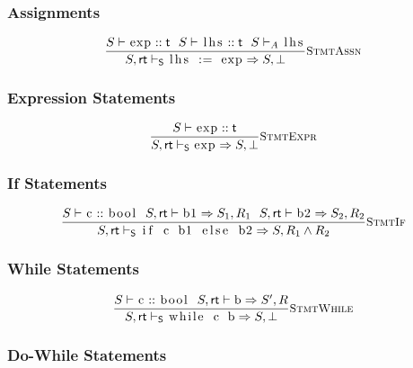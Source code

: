 \documentclass{article}
\newcommand{\code}[1]{\lstinline[columns=fixed]{#1}}
\newcommand{\drmrule}[5]{\frac{#1}{#2\vdash_{\mathsf{#3}}#4}\textsc{\small{#5}}}
\begin{document}
			\subsubsection{Assignments}
			
				\begin{align*}
					\drmrule{S\vdash\textnormal{\code{exp}} :: \mathsf{t}\ \ S\vdash\textnormal{\code{lhs}} :: \mathsf{t}\ \ S\vdash_A\textnormal{\code{lhs}}}{S,\mathsf{rt}}{S}{\textnormal{\code{lhs := exp}} \Rightarrow S,\bot}{StmtAssn}
				\end{align*}
			
			\subsubsection{Expression Statements}
			
				\begin{align*}
					\drmrule{S\vdash\textnormal{\code{exp}} :: \mathsf{t}}{S,\mathsf{rt}}{S}{\textnormal{\code{exp}} \Rightarrow S,\bot}{StmtExpr}
				\end{align*}
			
			\subsubsection{If Statements}
			
				\begin{align*}
					\drmrule{S\vdash\textnormal{\code{c}} :: \textnormal{\code{bool}}\ \ S,\mathsf{rt}\vdash\textnormal{\code{b1}}\Rightarrow S_1,R_1\ \ S,\mathsf{rt}\vdash\textnormal{\code{b2}}\Rightarrow S_2,R_2}{S,\mathsf{rt}}{S}{\textnormal{\code{if c b1 else b2}} \Rightarrow S,R_1\wedge R_2}{StmtIf}
				\end{align*}
			
			\subsubsection{While Statements}
			
				\begin{align*}
					\drmrule{S\vdash\textnormal{\code{c}} :: \textnormal{\code{bool}}\ \ S,\mathsf{rt}\vdash\textnormal{\code{b}}\Rightarrow S',R}{S,\mathsf{rt}}{S}{\textnormal{\code{while c b}} \Rightarrow S,\bot}{StmtWhile}
				\end{align*}
			
			\subsubsection{Do-While Statements}
			
\end{document}
